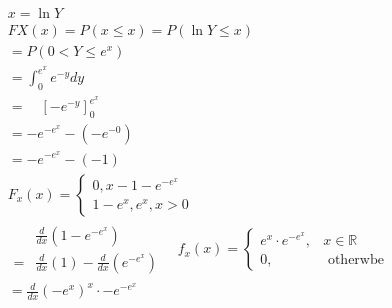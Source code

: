 \documentclass[]{article}
\begin{document}
\begin{math}
\begin{aligned}
&x=\ln Y\\
&F X(x)=P(x \leqslant x)=P(\ln Y \leqslant x)\\
&=P\left(0<Y \leqslant e^x\right)\\
&=\int_0^{e^x} e^{-y} d y\\
&=\quad\left[-e^{-y}\right]_0^{e^x}\\
&=-e^{-e^x}-\left(-e^{-0}\right)\\
&=-e^{-e^x}-(-1)\\
&F_x(x)=\left\{\begin{array}{c}
0, x-1-e^{-e^x} \\
1-e^x, e^x, x>0
\end{array}\right.\\
&\begin{aligned}
& \frac{d}{d x}\left(1-e^{-e^x}\right) \\
=& \frac{d}{d x}(1)-\frac{d}{d x}\left(e^{-e^x}\right)
\end{aligned} \quad f_x(x)=\left\{\begin{array}{cc}
e^x \cdot e^{-e^x}, & x \in \mathbb{R} \\
0, & \text { otherwbe }
\end{array}\right.\\
&=\frac{d}{d x}\left(-e^x\right)^x \cdot-e^{-e^x}
\end{aligned}
\end{math}
\end{document}

